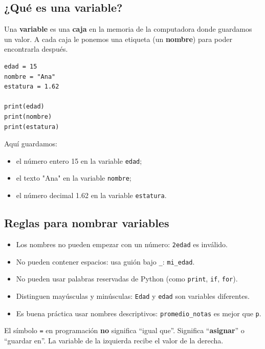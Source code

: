 \documentclass[11pt,a4paper]{article}
\begin{document}
\subsection{¿Qué es una variable?}

Una \textbf{variable} es una \textbf{caja} en la memoria de la computadora donde guardamos un valor. A cada caja le ponemos una etiqueta (un \textbf{nombre}) para poder encontrarla después.

\begin{cajaEjemplo}
\begin{lstlisting}[style=pythonStyle, caption={Creando variables}]
edad = 15
nombre = "Ana"
estatura = 1.62

print(edad)
print(nombre)
print(estatura)
\end{lstlisting}

Aquí guardamos:
\begin{itemize}
    \item el número entero 15 en la variable \texttt{edad};
    \item el texto "Ana" en la variable \texttt{nombre};
    \item el número decimal 1.62 en la variable \texttt{estatura}.
\end{itemize}
\end{cajaEjemplo}

\subsection{Reglas para nombrar variables}

\begin{itemize}
    \item Los nombres no pueden empezar con un número: \texttt{2edad} es inválido.
    \item No pueden contener espacios: usa guión bajo \texttt{\_}: \texttt{mi\_edad}.
    \item No pueden usar palabras reservadas de Python (como \texttt{print}, \texttt{if}, \texttt{for}).
    \item Distinguen mayúsculas y minúsculas: \texttt{Edad} y \texttt{edad} son variables diferentes.
    \item Es buena práctica usar nombres descriptivos: \texttt{promedio\_notas} es mejor que \texttt{p}.
\end{itemize}

\begin{cajaRecuerda}
El símbolo \texttt{=} en programación \textbf{no} significa ``igual que''. Significa ``\textbf{asignar}'' o ``guardar en''. La variable de la izquierda recibe el valor de la derecha.
\end{cajaRecuerda}
\end{document}

